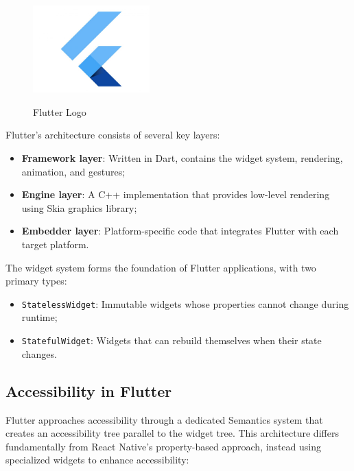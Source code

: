\begin{figure}[ht]
    \centering
    \includegraphics[width=0.4\textwidth, alt={Flutter Logo}]{img/flutter-logo.jpg}
    \caption{Flutter Logo}
\label{fig:flutter-logo}
\end{figure}

Flutter's architecture consists of several key layers:
\begin{itemize}
    \item \textbf{Framework layer}: Written in Dart, contains the widget system, rendering, animation, and gestures;
    \item \textbf{Engine layer}: A C++ implementation that provides low-level rendering using Skia graphics library;
    \item \textbf{Embedder layer}: Platform-specific code that integrates Flutter with each target platform.
\end{itemize}

The widget system forms the foundation of Flutter applications, with two primary types:
\begin{itemize}
    \item \texttt{StatelessWidget}: Immutable widgets whose properties cannot change during runtime;
    \item \texttt{StatefulWidget}: Widgets that can rebuild themselves when their state changes.
\end{itemize}

\subsection{Accessibility in Flutter}
Flutter approaches accessibility through a dedicated Semantics system that creates an accessibility tree parallel to the widget tree. This architecture differs fundamentally from React Native's property-based approach, instead using specialized widgets to enhance accessibility:

